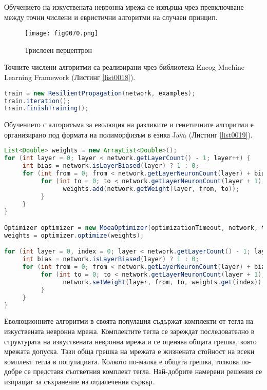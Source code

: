 Обучението на изкуствената невронна мрежа се извърша чрез превключване между точни числени и евристични алгоритми на случаен принцип. 

\begin{figure}[H]
  \centering
  \texttt{[image: fig0070.png]}
  \caption{Трислоен перцептрон}
\label{fig0070}
\end{figure}

Точните числени алгоритми са реализирани чрез библиотека Encog Machine Learning Framework (Листинг \ref{list0018}).

\begin{lstlisting}[caption=Обучение с устойчиво разпространение на грешката, language=Java, basicstyle=\tiny, label=list0018]
train = new ResilientPropagation(network, examples);
train.iteration();
train.finishTraining();
\end{lstlisting}

Обучението с алгоритъма за еволюция на разликите и генетичните алгоритми е организирано под формата на полиморфизъм в езика Java (Листинг \ref{list0019}).

\begin{lstlisting}[caption=Обучение с еволюционни евристични алгоритми, language=Java, basicstyle=\tiny, label=list0019]
List<Double> weights = new ArrayList<Double>();
for (int layer = 0; layer < network.getLayerCount() - 1; layer++) {
	 int bias = network.isLayerBiased(layer) ? 1 : 0;
	 for (int from = 0; from < network.getLayerNeuronCount(layer) + bias; from++) {
		  for (int to = 0; to < network.getLayerNeuronCount(layer + 1); to++) {
				weights.add(network.getWeight(layer, from, to));
		  }
	 }
}

Optimizer optimizer = new MoeaOptimizer(optimizationTimeout, network, train, populationSize, crossoverRate, scalingFactor);
weights = optimizer.optimize(weights);

for (int layer = 0, index = 0; layer < network.getLayerCount() - 1; layer++) {
	 int bias = network.isLayerBiased(layer) ? 1 : 0;
	 for (int from = 0; from < network.getLayerNeuronCount(layer) + bias; from++) {
		  for (int to = 0; to < network.getLayerNeuronCount(layer + 1); to++, index++) {
				network.setWeight(layer, from, to, weights.get(index));
		  }
	 }
}
\end{lstlisting}

Еволюционните алгоритми в своята популация съдържат комплекти от тегла на изкуствената невронна мрежа. Комплектите тегла се зареждат последователно в структурата на изкуствената невронна мрежа и се оценява общата грешка, която мрежата допуска. Тази обща грешка на мрежата е жизнената стойност на всеки комплект тегла в популацията. Колкото по-малка е общата грешка, толкова по-добре се представя съответния комплект тегла. Най-добрите намерени решения се изпращат за съхранение на отдалечения сървър. 

